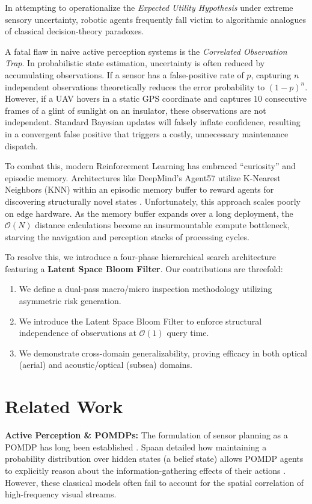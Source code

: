 \documentclass[conference]{IEEEtran}
\begin{document}
In attempting to operationalize the \textit{Expected Utility Hypothesis} under extreme sensory uncertainty, robotic agents frequently fall victim to algorithmic analogues of classical decision-theory paradoxes.

A fatal flaw in naive active perception systems is the \textit{Correlated Observation Trap}. In probabilistic state estimation, uncertainty is often reduced by accumulating observations. If a sensor has a false-positive rate of $p$, capturing $n$ independent observations theoretically reduces the error probability to $(1-p)^n$. However, if a UAV hovers in a static GPS coordinate and captures $10$ consecutive frames of a glint of sunlight on an insulator, these observations are not independent. Standard Bayesian updates will falsely inflate confidence, resulting in a convergent false positive that triggers a costly, unnecessary maintenance dispatch.

To combat this, modern Reinforcement Learning has embraced ``curiosity'' and episodic memory. Architectures like DeepMind's Agent57 utilize K-Nearest Neighbors (KNN) within an episodic memory buffer to reward agents for discovering structurally novel states \cite{badia2020agent57}. Unfortunately, this approach scales poorly on edge hardware. As the memory buffer expands over a long deployment, the $\mathcal{O}(N)$ distance calculations become an insurmountable compute bottleneck, starving the navigation and perception stacks of processing cycles.

To resolve this, we introduce a four-phase hierarchical search architecture featuring a \textbf{Latent Space Bloom Filter}. Our contributions are threefold:
\begin{enumerate}
    \item We define a dual-pass macro/micro inspection methodology utilizing asymmetric risk generation.
    \item We introduce the Latent Space Bloom Filter to enforce structural independence of observations at $\mathcal{O}(1)$ query time.
    \item We demonstrate cross-domain generalizability, proving efficacy in both optical (aerial) and acoustic/optical (subsea) domains.
\end{enumerate}

\section{Related Work}
\textbf{Active Perception \& POMDPs:} The formulation of sensor planning as a POMDP has long been established \cite{kaelbling1998planning}. Spaan detailed how maintaining a probability distribution over hidden states (a belief state) allows POMDP agents to explicitly reason about the information-gathering effects of their actions \cite{spaan2015hidden}. However, these classical models often fail to account for the spatial correlation of high-frequency visual streams.
\end{document}

